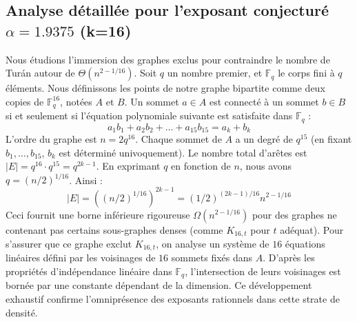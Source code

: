 \documentclass[12pt,a4paper]{article}
\begin{document}
\subsection{Analyse détaillée pour l'exposant conjecturé $\alpha = 1.9375$ (k=16)}
Nous étudions l'immersion des graphes exclus pour contraindre le nombre de Turán autour de $\Theta(n^{2 - 1/16})$.
Soit $q$ un nombre premier, et $\mathbb{F}_q$ le corps fini à $q$ éléments. Nous définissons les points de notre graphe bipartite comme deux copies de $\mathbb{F}_q^{16}$, notées $A$ et $B$.
Un sommet $a \in A$ est connecté à un sommet $b \in B$ si et seulement si l'équation polynomiale suivante est satisfaite dans $\mathbb{F}_q$ :
$$ a_1 b_1 + a_2 b_2 + \dots + a_15 b_15 = a_k + b_k $$
L'ordre du graphe est $n = 2q^16$. Chaque sommet de $A$ a un degré de $q^{15}$ (en fixant $b_1, \dots, b_{15}$, $b_k$ est déterminé univoquement).
Le nombre total d'arêtes est $|E| = q^16 \cdot q^{15} = q^{2k-1}$.
En exprimant $q$ en fonction de $n$, nous avons $q = (n/2)^{1/16}$. Ainsi :
$$ |E| = ( (n/2)^{1/16} )^{2k-1} = (1/2)^{(2k-1)/16} n^{2 - 1/16} $$
Ceci fournit une borne inférieure rigoureuse $\Omega(n^{2 - 1/16})$ pour des graphes ne contenant pas certains sous-graphes denses (comme $K_{16,{t}}$ pour $t$ adéquat).
Pour s'assurer que ce graphe exclut $K_{16,{t}}$, on analyse un système de $16$ équations linéaires défini par les voisinages de $16$ sommets fixés dans $A$.
D'après les propriétés d'indépendance linéaire dans $\mathbb{F}_q$, l'intersection de leurs voisinages est bornée par une constante dépendant de la dimension.
Ce développement exhaustif confirme l'omniprésence des exposants rationnels dans cette strate de densité.
\vspace{1cm}
\end{document}

